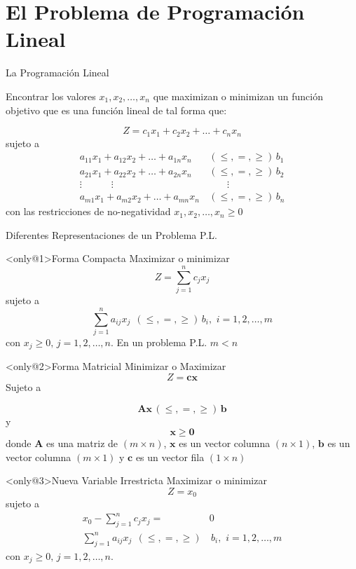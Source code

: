 \section{El Problema de Programación Lineal}
\label{sec:lpp-problem}

\begin{frame}{La Programación Lineal}
  
  Encontrar los valores $x_1, x_2, \ldots, x_n$ que maximizan o minimizan un función objetivo que es una función lineal de tal forma que:

  \[ Z = c_1x_1 + c_2x_2 + \ldots + c_n x_n\]
  sujeto a
  \begin{align*}
    a_{11}x_1 + a_{12}x_2 +  \ldots + a_{1n}x_n & \, (\leq, =, \geq)\, b_1\\
    a_{21}x_1 + a_{22}x_2 +  \ldots + a_{2n}x_n &\, (\leq, =, \geq)\, b_2\\
    \vdots   \quad\quad\quad \vdots   \quad\quad\quad  & \quad\quad \vdots\\
    a_{m1}x_1 + a_{m2}x_2 + \ldots + a_{mn}x_n & \, (\leq, =, \geq)\, b_n
  \end{align*}
  con las restricciones de no-negatividad $x_1, x_2, \ldots, x_n \geq 0$
\end{frame}

\begin{frame}{Diferentes Representaciones de un Problema P.L.}
  
  \begin{block}<only@1>{Forma Compacta} \justifying
      Maximizar o minimizar \[ Z = \sum_{j=1}^{n} c_jx_j\]
      sujeto a \[ \sum_{j=1}^{n} a_{ij}x_j \,\; (\leq, =, \geq) \, b_i, \,\, i = 1, 2, \ldots, m \]
      con $x_j \geq 0, \, j = 1, 2, \ldots, n$. \alert{En un problema P.L. $m < n$}
    \end{block}
    
    \begin{block}<only@2>{Forma Matricial}\justifying
      Minimizar o Maximizar \[Z = \bm{cx}\]
      Sujeto a

      \[ \bm{Ax} \, (\leq, =, \geq) \, \bm{b}\]
      y \[ \bm{x} \geq \bm{0}\]
      donde $\bm{A}$ es una matriz de $(m  \times n)$, $\bm{x}$ es un vector columna $(n \times 1)$, $\bm{b}$ es un vector columna $(m \times 1)$ y $\bm{c}$ es un vector fila $(1 \times n)$
    \end{block}

      \begin{block}<only@3>{Nueva Variable Irrestricta} \justifying
      Maximizar o minimizar \[ Z = x_0\]
      sujeto a
      \begin{align*}
        x_0 - \sum_{j=1}^{n} c_jx_j =& 0\\
        \sum_{j=1}^{n} a_{ij}x_j \,\; (\leq, =, \geq)& \, b_i, \,\, i = 1, 2, \ldots, m
      \end{align*}
      con $x_j \geq 0, \, j = 1, 2, \ldots, n$. 
    \end{block}
\end{frame}



